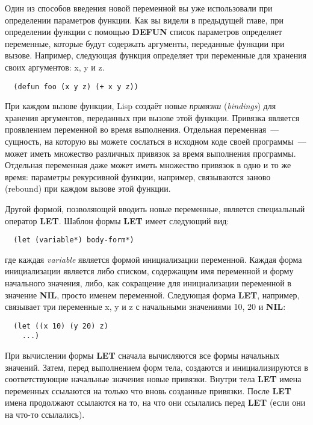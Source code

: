Один из способов введения новой переменной вы уже использовали при определении параметров
функции. Как вы видели в предыдущей главе, при определении функции с помощью
\textbf{DEFUN} список параметров определяет переменные, которые будут содержать аргументы,
переданные функции при вызове. Например, следующая функция определяет три переменные для
хранения своих аргументов: x, y и z.

\begin{lstlisting}
  (defun foo (x y z) (+ x y z))
\end{lstlisting}

При каждом вызове функции, Lisp создаёт новые \textit{привязки} (\textit{bindings}) для
хранения аргументов, переданных при вызове этой функции. Привязка является проявлением
переменной во время выполнения. Отдельная переменная~--- сущность, на которую вы можете
сослаться в исходном коде своей программы~--- может иметь множество различных привязок за
время выполнения программы. Отдельная переменная даже может иметь множество привязок в
одно и то же время: параметры рекурсивной функции, например, связываются заново (rebound)
при каждом вызове этой функции.

Другой формой, позволяющей вводить новые переменные, является специальный оператор
\textbf{LET}. Шаблон формы \textbf{LET} имеет следующий вид:

\begin{lstlisting}
  (let (variable*) body-form*)
\end{lstlisting}

где каждая \textit{variable} является формой инициализации переменной. Каждая форма
инициализации является либо списком, содержащим имя переменной и форму начального
значения, либо, как сокращение для инициализации переменной в значение \textbf{NIL},
просто именем переменной. Следующая форма \textbf{LET}, например, связывает три переменные
x, y и z с начальными значениями 10, 20 и \textbf{NIL}:

\begin{lstlisting}
  (let ((x 10) (y 20) z)
    ...)
\end{lstlisting}

При вычислении формы \textbf{LET} сначала вычисляются все формы начальных значений. Затем,
перед выполнением форм тела, создаются и инициализируются в соответствующие начальные
значения новые привязки. Внутри тела \textbf{LET} имена переменных ссылаются на только что
вновь созданные привязки. После \textbf{LET} имена продолжают ссылаются на то, на что они
ссылались перед \textbf{LET} (если они на что-то ссылались).

